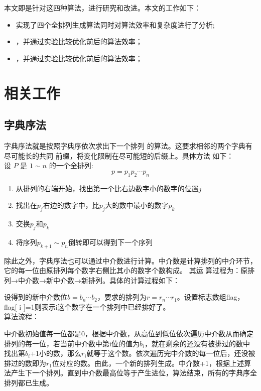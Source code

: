 \documentclass[6pt, twocolumn]{ctexart}
\begin{document}
本文即是针对这四种算法，进行研究和改进。本文的工作如下：\\
\begin{itemize}
  \item 实现了四个全排列生成算法同时对算法效率和复杂度进行了分析;
  \item {\color{red}{利用对--算法排列产生中介数的过程进行了优化}}，并通过实验比较优化前后的算法效率；
  \item {\color{red}{利用二叉树对--算法排列产生中介数的过程进行了优化}}，并通过实验比较优化前后的算法效率； 
\end{itemize}
\section{相关工作}
\subsection{字典序法}
字典序法就是按照字典序依次求出下一个排列 的算法。这要求相邻的两个字典有尽可能长的共同 前缀，将变化限制在尽可能短的后缀上。具体方法 如下：\\
设 $P$ 是 $1\sim n$ 的一个全排列:\\
\begin{displaymath}
p=p_1p_2\cdots p_n
\end{displaymath}

\begin{enumerate}
  \item 从排列的右端开始，找出第一个比右边数字小的数字的位置$j$
  \item 找出在$p_j$右边的数字中，比$p_j$大的数中最小的数字$p_k$
  \item 交换$p_j$和$p_k$
  \item 将序列$p_{k+1}\sim p_{n}$倒转即可以得到下一个序列
\end{enumerate}	

除此之外，字典序法也可以通过中介数进行计算。中介数是计算排列的中介环节，它的每一位由原排列每个数字右侧比其小的数字个数构成。 其运 算过程为：原排列→中介数→新中介数→新排列。具体的计算过程如下：

设得到的新中介数位$b = b_n\cdots b_{2}$，要求的排列为$r= r_n\cdots r_1$。设置标志数组flag，flag[ i ]=1则表示i这个数字在一个排列中已经排好了。\\
算法流程：

中介数初始值每一位都是0，根据中介数，从高位到低位依次遍历中介数从而确定排列的每一位，若当前中介数中第i位的值为$b_i$，就在剩余的还没有被排过的数中找出第$b_i$+1小的数，那么$r_i$就等于这个数。依次遍历完中介数的每一位后，还没被排过的数即为$r_1$位对应的数。由此，一个新的排列生成。中介数+1，根据上述算法产生下一个排列。直到中介数最高位等于产生进位，算法结束，所有的字典序全排列都已生成。
\end{document}
